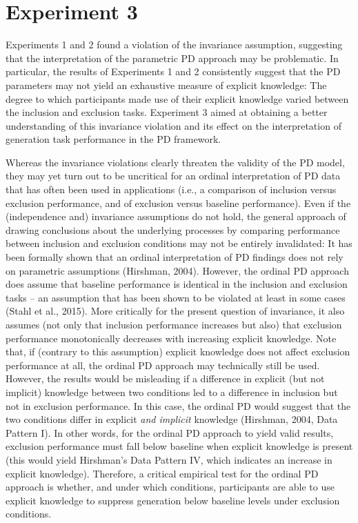 \documentclass[floatsintext,man]{apa6}
\begin{document}
\section{Experiment 3}\label{experiment-3}

Experiments 1 and 2 found a violation of the invariance assumption,
suggesting that the interpretation of the parametric PD approach may be
problematic. In particular, the results of Experiments 1 and 2
consistently suggest that the PD parameters may not yield an exhaustive
measure of explicit knowledge: The degree to which participants made use
of their explicit knowledge varied between the inclusion and exclusion
tasks. Experiment 3 aimed at obtaining a better understanding of this
invariance violation and its effect on the interpretation of generation
task performance in the PD framework.

Whereas the invariance violations clearly threaten the validity of the
PD model, they may yet turn out to be uncritical for an ordinal
interpretation of PD data that has often been used in applications
(i.e., a comparison of inclusion versus exclusion performance, and of
exclusion versus baseline performance). Even if the (independence and)
invariance assumptions do not hold, the general approach of drawing
conclusions about the underlying processes by comparing performance
between inclusion and exclusion conditions may not be entirely
invalidated: It has been formally shown that an ordinal interpretation
of PD findings does not rely on parametric assumptions (Hirshman, 2004).
However, the ordinal PD approach does assume that baseline performance
is identical in the inclusion and exclusion tasks -- an assumption that
has been shown to be violated at least in some cases (Stahl et al.,
2015). More critically for the present question of invariance, it also
assumes (not only that inclusion performance increases but also) that
exclusion performance monotonically decreases with increasing explicit
knowledge. Note that, if (contrary to this assumption) explicit
knowledge does not affect exclusion performance at all, the ordinal PD
approach may technically still be used. However, the results would be
misleading if a difference in explicit (but not implicit) knowledge
between two conditions led to a difference in inclusion but not in
exclusion performance. In this case, the ordinal PD would suggest that
the two conditions differ in explicit \emph{and implicit} knowledge
(Hirshman, 2004, Data Pattern I). In other words, for the ordinal PD
approach to yield valid results, exclusion performance must fall below
baseline when explicit knowledge is present (this would yield Hirshman's
Data Pattern IV, which indicates an increase in explicit knowledge).
Therefore, a critical empirical test for the ordinal PD approach is
whether, and under which conditions, participants are able to use
explicit knowledge to suppress generation below baseline levels under
exclusion conditions.
\end{document}

